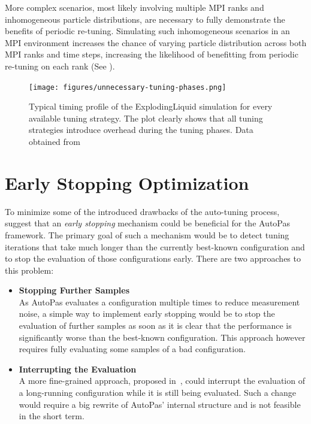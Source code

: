 \documentclass[conference]{IEEEtran}
\begin{document}
More complex scenarios, most likely involving multiple MPI ranks and inhomogeneous particle distributions, are necessary to fully demonstrate the benefits of periodic re-tuning. Simulating such inhomogeneous scenarios in an MPI environment increases the chance of varying particle distribution across both MPI ranks and time steps, increasing the likelihood of benefitting from periodic re-tuning on each rank (See \cite{Newcome2023Poster}).

\begin{figure}[h]
    \centering
    \texttt{[image: figures/unnecessary-tuning-phases.png]}
    \caption{
        Typical timing profile of the ExplodingLiquid simulation for every available tuning strategy. The plot clearly shows that all tuning strategies introduce overhead during the tuning phases. Data obtained from \cite{lerchner2024}
    }
    \label{fig:unnecessary-tuning-phases}
\end{figure}

\newpage

\section{Early Stopping Optimization}
\label{sec:early-stopping}

To minimize some of the introduced drawbacks of the auto-tuning process, \cite{endreport.pdf}\cite{Manuel_Lerchner_Thesis.pdf}\cite{autopas_issue673} suggest that an \textit{early stopping} mechanism could be beneficial for the AutoPas framework. The primary goal of such a mechanism would be to detect tuning iterations that take much longer than the currently best-known configuration and to stop the evaluation of those configurations early. There are two approaches to this problem:


\begin{itemize}
    \item \textbf{Stopping Further Samples}\\
          As AutoPas evaluates a configuration multiple times to reduce measurement noise, a simple way to implement early stopping would be to stop the evaluation of further samples as soon as it is clear that the performance is significantly worse than the best-known configuration. This approach however requires fully evaluating some samples of a bad configuration.
    \item \textbf{Interrupting the Evaluation}\\
          A more fine-grained approach, proposed in~\cite{endreport.pdf}, could interrupt the evaluation of a long-running configuration while it is still being evaluated. Such a change would require a big rewrite of AutoPas' internal structure and is not feasible in the short term.
\end{itemize}
\end{document}
